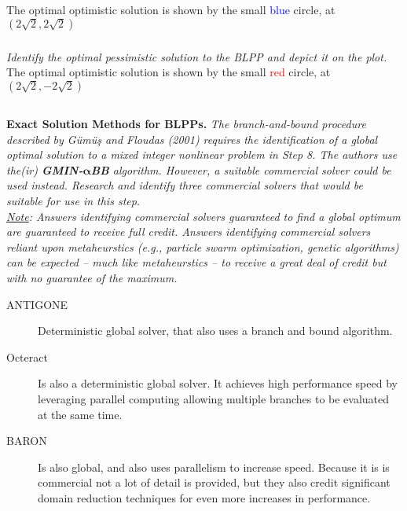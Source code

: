 \documentclass[12pt]{amsart}
\begin{document}
	The optimal optimistic solution is shown by the small \textcolor{blue}{blue} circle, at $(2\sqrt{2},2\sqrt{2})$

\subsubsection{}
\textit{Identify the optimal pessimistic solution to the BLPP and depict it on the plot.} \\

	The optimal optimistic solution is shown by the small \textcolor{red}{red} circle, at $(2\sqrt{2},-2\sqrt{2})$ \\

\subsection{}
\textbf{Exact Solution Methods for BLPPs.} 
\textit{The branch-and-bound procedure described by Gümüş and Floudas (2001) requires the identification of a global optimal solution to a mixed integer nonlinear problem in Step 8. The authors use the(ir) \textbf{GMIN-}$\mathbf\alpha$\textbf{BB} algorithm. However, a suitable commercial solver could be used instead. Research and identify three commercial solvers that would be suitable for use in this step.} \\

\textit{\underline{Note}: Answers identifying commercial solvers guaranteed to find a global optimum are guaranteed to receive full credit. Answers identifying commercial solvers reliant upon metaheurstics (e.g., particle swarm optimization, genetic algorithms) can be expected -- much like metaheurstics -- to receive a great deal of credit but with no guarantee of the
maximum.}\\

\begin{description}
	\item[ANTIGONE] Deterministic global solver, that also uses a branch and bound algorithm. \\
	
	\item[Octeract] Is also a deterministic global solver. It achieves high performance speed by leveraging 
		parallel computing allowing multiple branches to be evaluated at the same time. \\
	
	\item[BARON] Is also global, and also uses parallelism to increase speed. 
		Because it is is commercial not a lot of detail is provided, 
		but they also credit significant domain reduction techniques for even more increases in performance. \\
\end{description}
\end{document}
